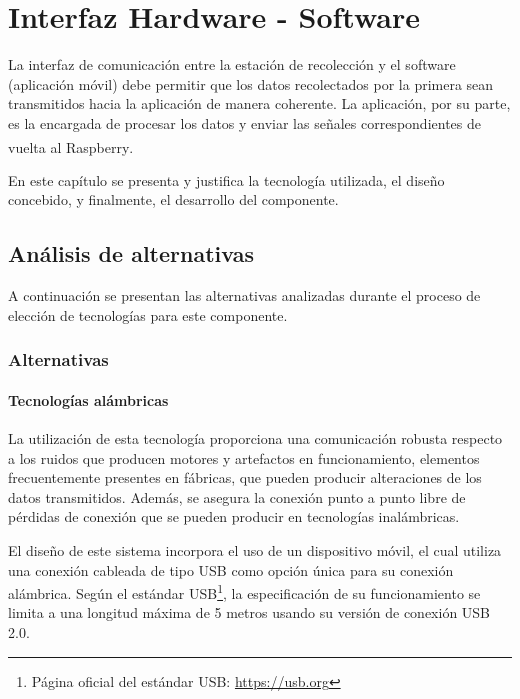 \chapter{Interfaz Hardware - Software}
\label{capituloInterfaz}
\par La interfaz de comunicación entre la estación de recolección y el software (aplicación móvil) debe permitir que los datos recolectados por la primera sean transmitidos hacia la aplicación de manera coherente. La aplicación, por su parte, es la encargada de procesar los datos y enviar las señales correspondientes de vuelta al Raspberry\textsuperscript{\textregistered}.
\par En este capítulo se presenta y justifica la tecnología utilizada, el diseño concebido, y finalmente, el desarrollo del componente.

    \section{Análisis de alternativas}
    \par A continuación se presentan las alternativas analizadas durante el proceso de elección de tecnologías para este componente.
        \subsection{Alternativas}
            \subsubsection{Tecnologías alámbricas}
                \par La utilización de esta tecnología proporciona una comunicación robusta respecto a los ruidos que producen motores y artefactos en funcionamiento, elementos frecuentemente presentes en fábricas, que pueden producir alteraciones de los datos transmitidos. Además, se asegura la conexión punto a punto libre de pérdidas de conexión que se pueden producir en tecnologías inalámbricas.
                
                \par El diseño de este sistema incorpora el uso de un dispositivo móvil, el cual utiliza una conexión cableada de tipo USB como opción única para su conexión alámbrica. Según el estándar USB\footnote{Página oficial del estándar USB: \url{https://usb.org}}, la especificación de su funcionamiento se limita a una longitud máxima de 5 metros usando su versión de conexión USB 2.0.
                
